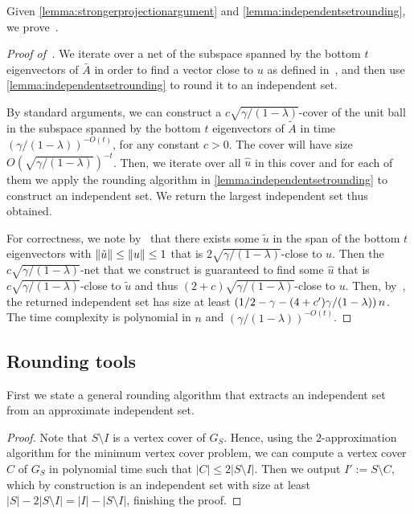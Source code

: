 Given \cref{lemma:strongerprojectionargument} and \cref{lemma:independentsetrounding}, we prove~.

\begin{proof}[Proof of~]
We iterate over a net of the subspace spanned by the bottom $t$ eigenvectors of $\bar{A}$ in order to find a vector close to $u$ as defined in~, and then use \cref{lemma:independentsetrounding} to round it to an independent set.

By standard arguments, we can construct a $c \sqrt{\gamma/(1-\lambda)}$-cover of the unit ball in the subspace spanned by the bottom $t$ eigenvectors of $\tilde{A}$ in time $(\gamma/(1-\lambda))^{-O(t)}$, for any constant $c > 0$.
The cover will have size $O(\sqrt{\gamma/(1-\lambda)})^{-t}$.
Then, we iterate over all $\hat{u}$ in this cover and for each of them we apply the rounding algorithm in \cref{lemma:independentsetrounding} to construct an independent set.
We return the largest independent set thus obtained.

For correctness, we note by~ that there exists some $\tilde{u}$ in the span of the bottom $t$ eigenvectors with $\lVert\tilde{u}\rVert \leq \lVert u\rVert \leq 1$ that is $2\sqrt{\gamma/(1-\lambda)}$-close to $u$.
Then the $c \sqrt{\gamma/(1-\lambda)}$-net that we construct is guaranteed to find some $\hat{u}$ that is $c \sqrt{\gamma/(1-\lambda)}$-close to $\tilde{u}$ and thus $(2+c)\sqrt{\gamma/(1-\lambda)}$-close to $u$.
Then, by~, the returned independent set has size at least $\left(1/2-\gamma - (4+c')\gamma/(1-\lambda)\right)n$. The time complexity is polynomial in $n$ and $(\gamma/(1-\lambda))^{-O(t)}$.
\end{proof}

\subsection{Rounding tools}

First we state a general rounding algorithm that extracts an independent set from an approximate independent set.

\begin{proof}
    Note that $S\setminus I$ is a vertex cover of $G_S$.
    Hence, using the $2$-approximation algorithm for the minimum vertex cover problem, we can compute a vertex cover $C$ of $G_S$ in polynomial time such that $|C| \leq 2|S \setminus I|$.
    Then we output $I':=S\setminus C$, which by construction is an independent set with size at least $|S| - 2|S \setminus I|=|I| - |S \setminus I|$, finishing the proof.
\end{proof}

